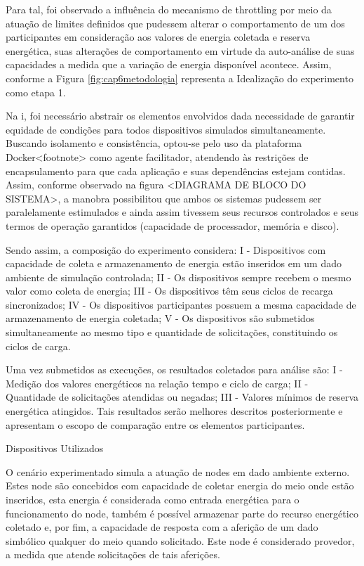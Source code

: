 Para tal, foi observado a influência do mecanismo de throttling por meio da atuação de limites definidos que pudessem alterar o comportamento de um dos participantes em consideração aos valores de energia coletada e reserva energética, suas alterações de comportamento em virtude da  auto-análise de suas capacidades a medida que a variação de energia disponível acontece. Assim, conforme a Figura \ref{fig:cap6metodologia} representa a Idealização do experimento como etapa 1.

Na i, foi necessário abstrair os elementos envolvidos dada necessidade de garantir equidade de condições para todos dispositivos simulados simultaneamente. Buscando isolamento e consistência, optou-se pelo uso da plataforma Docker<footnote> como agente facilitador, atendendo às restrições de encapsulamento para que cada aplicação e suas dependências estejam contidas. Assim, conforme observado na figura <DIAGRAMA DE BLOCO DO SISTEMA>, a manobra possibilitou que ambos os sistemas pudessem ser paralelamente estimulados e ainda assim tivessem seus recursos controlados e seus termos de operação garantidos (capacidade de processador, memória e disco). 

Sendo assim, a composição do experimento considera:  I - Dispositivos com capacidade de coleta e armazenamento de energia estão inseridos em um dado ambiente de simulação controlada; II - Os dispositivos sempre recebem o mesmo valor como coleta de energia; III - Os dispositivos têm seus ciclos de recarga sincronizados; IV - Os dispositivos participantes possuem a mesma capacidade de armazenamento de energia coletada; V - Os dispositivos são submetidos simultaneamente ao mesmo tipo e quantidade de solicitações, constituindo os ciclos de carga.

Uma vez submetidos as execuções, os resultados coletados para análise são: I - Medição dos valores energéticos na relação tempo e ciclo de carga; II - Quantidade de solicitações atendidas ou negadas; III - Valores mínimos de reserva energética atingidos. Tais resultados serão melhores descritos posteriormente e apresentam o escopo de comparação entre os elementos participantes.



Dispositivos Utilizados


O cenário experimentado simula a atuação de nodes em dado ambiente externo. Estes node são concebidos com capacidade de coletar energia do meio onde estão inseridos, esta energia é considerada como entrada energética para o funcionamento do node, também é possível armazenar parte do recurso energético coletado e, por fim, a capacidade de resposta com a aferição de um dado simbólico qualquer do meio quando solicitado. Este node é considerado provedor, a medida que atende solicitações de tais aferições.
 